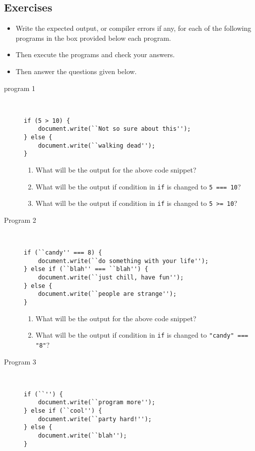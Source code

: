 \documentclass[11pt,a4paper]{article}
\def\AnswerBox{\fbox{\begin{minipage}{4in}\hfill\vspace{0.5in}\end{minipage}}}
\begin{document}
\subsection*{Exercises}
\begin{itemize}
\item Write the expected output, or compiler errors if any, for each of the following programs in the box provided below each program.
\item Then execute the programs and check your answers.
\item Then answer the questions given below.
\end{itemize}
\begin{description}
\item[program 1]\
\begin{lstlisting}
if (5 > 10) {
    document.write(``Not so sure about this'');
} else {
    document.write(``walking dead'');
}
\end{lstlisting}

\AnswerBox

\begin{enumerate}[label=\bfseries Q\arabic*:]\itemsep10pt
\item What will be the output for the above code snippet?
\item What will be the output if condition in \texttt{if} is changed to \texttt{5 === 10}?
\item What will be the output if condition in \texttt{if} is changed to \texttt{5 >= 10}?
\end{enumerate}

\item[Program 2]\
\begin{lstlisting}
if (``candy'' === 8) {
    document.write(``do something with your life'');
} else if (``blah'' === ``blah'') {
    document.write(``just chill, have fun'');
} else {
    document.write(``people are strange'');
}\end{lstlisting}

\AnswerBox

\begin{enumerate}[label=\bfseries Q\arabic*:]\itemsep10pt
\item What will be the output for the above code snippet?
\item What will be the output if condition in \texttt{if} is changed to \texttt{"candy" === "8"}?
\end{enumerate}
\item [Program 3]\ 
\begin{lstlisting}
if (``'') {
    document.write(``program more'');
} else if (``cool'') {
    document.write(``party hard!'');
} else {
    document.write(``blah'');
}
\end{lstlisting}
\AnswerBox


\end{description}
\end{document}
